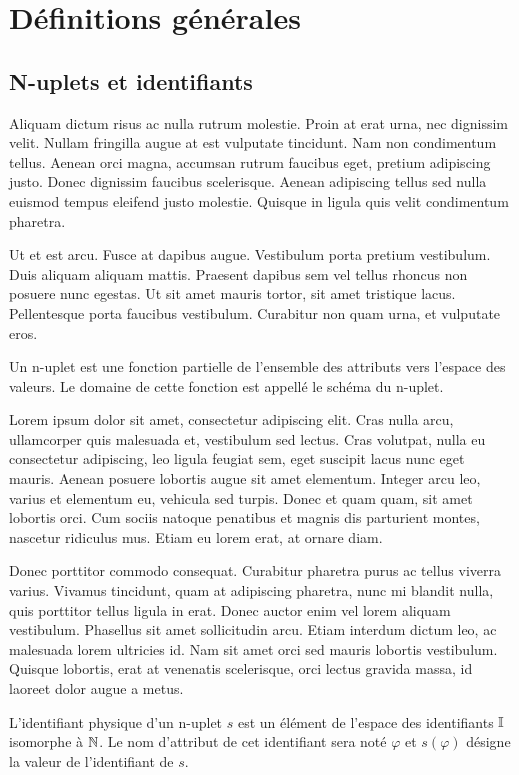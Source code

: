 \section{Définitions générales}
\subsection{N-uplets et identifiants}Aliquam dictum risus ac nulla rutrum molestie. Proin at erat urna, nec dignissim velit. Nullam fringilla augue at est vulputate tincidunt. Nam non condimentum tellus. Aenean orci magna, accumsan rutrum faucibus eget, pretium adipiscing justo. Donec dignissim faucibus scelerisque. Aenean adipiscing tellus sed nulla euismod tempus eleifend justo molestie. Quisque in ligula quis velit condimentum pharetra.

Ut et est arcu. Fusce at dapibus augue. Vestibulum porta pretium vestibulum. Duis aliquam aliquam mattis. Praesent dapibus sem vel tellus rhoncus non posuere nunc egestas. Ut sit amet mauris tortor, sit amet tristique lacus. Pellentesque porta faucibus vestibulum. Curabitur non quam urna, et vulputate eros. 
\begin{defi}[n-uplet]
    Un n-uplet est une fonction partielle de l'ensemble des attributs vers l'espace des valeurs. Le domaine de cette fonction est appellé le schéma du n-uplet.
\end{defi}
Lorem ipsum dolor sit amet, consectetur adipiscing elit. Cras nulla arcu, ullamcorper quis malesuada et, vestibulum sed lectus. Cras volutpat, nulla eu consectetur adipiscing, leo ligula feugiat sem, eget suscipit lacus nunc eget mauris. Aenean posuere lobortis augue sit amet elementum. Integer arcu leo, varius et elementum eu, vehicula sed turpis. Donec et quam quam, sit amet lobortis orci. Cum sociis natoque penatibus et magnis dis parturient montes, nascetur ridiculus mus. Etiam eu lorem erat, at ornare diam.

Donec porttitor commodo consequat. Curabitur pharetra purus ac tellus viverra varius. Vivamus tincidunt, quam at adipiscing pharetra, nunc mi blandit nulla, quis porttitor tellus ligula in erat. Donec auctor enim vel lorem aliquam vestibulum. Phasellus sit amet sollicitudin arcu. Etiam interdum dictum leo, ac malesuada lorem ultricies id. Nam sit amet orci sed mauris lobortis vestibulum. Quisque lobortis, erat at venenatis scelerisque, orci lectus gravida massa, id laoreet dolor augue a metus. 
\begin{defi}
    L'identifiant physique d'un n-uplet $s$ est un élément de l'espace des identifiants $\mathbb{I}$ isomorphe à $\mathbb{N}$. Le nom d'attribut de cet identifiant sera noté $\varphi$ et $s(\varphi)$ désigne la valeur de l'identifiant de $s$.
\end{defi}


